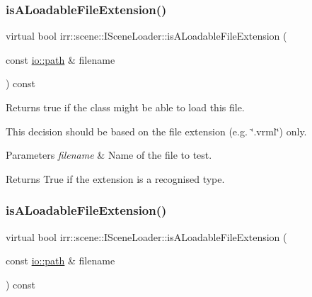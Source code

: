 \subsubsection{\texorpdfstring{is\+A\+Loadable\+File\+Extension()}{isALoadableFileExtension()}\hspace{0.1cm}{\footnotesize\ttfamily [1/2]}}
{\footnotesize\ttfamily virtual bool irr\+::scene\+::\+I\+Scene\+Loader\+::is\+A\+Loadable\+File\+Extension (\begin{DoxyParamCaption}\item[{const \hyperlink{namespaceirr_1_1io_a6468281622ce3a1c46b72e19f32dded5}{io\+::path} \&}]{filename }\end{DoxyParamCaption}) const\hspace{0.3cm}{\ttfamily [pure virtual]}}



Returns true if the class might be able to load this file. 

This decision should be based on the file extension (e.\+g. \char`\"{}.\+vrml\char`\"{}) only. 
\begin{DoxyParams}{Parameters}
{\em filename} & Name of the file to test. \\
\hline
\end{DoxyParams}
\begin{DoxyReturn}{Returns}
True if the extension is a recognised type. 
\end{DoxyReturn}
\mbox{\label{classirr_1_1scene_1_1ISceneLoader_a55b0367762135b84a077ef75ca942594}} 
\subsubsection{\texorpdfstring{is\+A\+Loadable\+File\+Extension()}{isALoadableFileExtension()}\hspace{0.1cm}{\footnotesize\ttfamily [2/2]}}
{\footnotesize\ttfamily virtual bool irr\+::scene\+::\+I\+Scene\+Loader\+::is\+A\+Loadable\+File\+Extension (\begin{DoxyParamCaption}\item[{const \hyperlink{namespaceirr_1_1io_a6468281622ce3a1c46b72e19f32dded5}{io\+::path} \&}]{filename }\end{DoxyParamCaption}) const\hspace{0.3cm}{\ttfamily [pure virtual]}}



